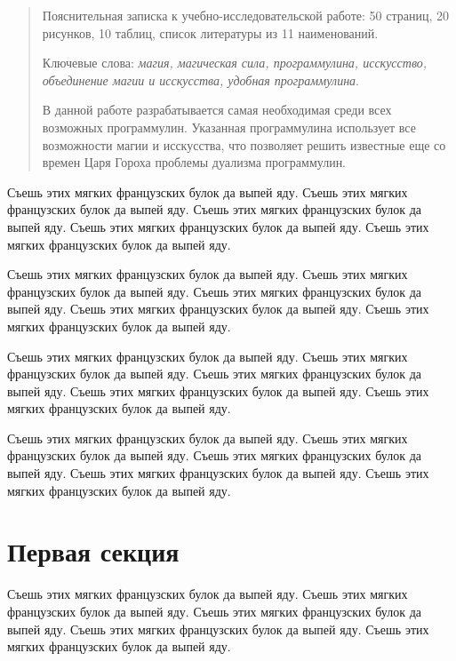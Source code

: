 \documentclass{./../class/UIR}
\begin{document}
\maketitle

\begin{abstract}
Пояснительная записка к учебно-исследовательской работе: 50 страниц, 20 рисунков, 10 таблиц, список литературы из 11 наименований.

Ключевые слова: \textit{магия, магическая сила, программулина, исскусство, объединение магии и исскусства, удобная программулина}.

В данной работе разрабатывается самая необходимая среди всех возможных программулин. Указанная программулина использует все возможности магии и исскусства, что позволяет решить известные еще со времен Царя Гороха проблемы дуализма программулин.
\end{abstract}

\tableofcontents
{}

Съешь этих мягких французских булок да выпей яду. Съешь этих мягких французских булок да выпей яду. Съешь этих мягких французских булок да выпей яду. Съешь этих мягких французских булок да выпей яду. Съешь этих мягких французских булок да выпей яду. 

Съешь этих мягких французских булок да выпей яду. Съешь этих мягких французских булок да выпей яду. Съешь этих мягких французских булок да выпей яду. Съешь этих мягких французских булок да выпей яду. Съешь этих мягких французских булок да выпей яду.

Съешь этих мягких французских булок да выпей яду. Съешь этих мягких французских булок да выпей яду. Съешь этих мягких французских булок да выпей яду. Съешь этих мягких французских булок да выпей яду. Съешь этих мягких французских булок да выпей яду. 

Съешь этих мягких французских булок да выпей яду. Съешь этих мягких французских булок да выпей яду. Съешь этих мягких французских булок да выпей яду. Съешь этих мягких французских булок да выпей яду. Съешь этих мягких французских булок да выпей яду.

\section{Первая секция}
Съешь этих мягких французских булок да выпей яду. Съешь этих мягких французских булок да выпей яду. Съешь этих мягких французских булок да выпей яду. Съешь этих мягких французских булок да выпей яду. Съешь этих мягких французских булок да выпей яду. 
\end{document}
